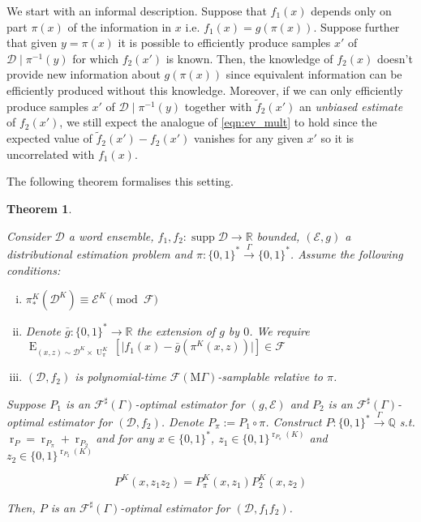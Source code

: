 \documentclass{article}
\numberwithin{equation}{section}
\theoremstyle{definition}
\theoremstyle{plain}
\newtheorem{theorem}{Theorem}[section]
\newcommand{\Bool}{\{0,1\}}
\newcommand{\Words}{{\Bool^*}}
\newcommand{\WordsLen}[1]{{\Bool^{#1}}}
\DeclareMathOperator{\Supp}{supp}
\DeclareMathOperator{\E}{E}
\DeclareMathOperator{\R}{r}
\DeclareMathOperator{\Un}{U}
\newcommand{\Rats}{\mathbb{Q}}
\newcommand{\Reals}{\mathbb{R}}
\newcommand{\Abs}[1]{\lvert #1 \rvert}
\newcommand{\Dist}{\mathcal{D}}
\newcommand{\MGrow}{\mathrm{M}\Gamma}
\newcommand{\Fall}{\mathcal{F}}
\newcommand{\ESG}{\Fall^\sharp(\Gamma)}
\newcommand{\EMG}{\Fall(\MGrow)}
\newcommand{\Scheme}{\xrightarrow{\Gamma}}
\begin{document}
We start with an informal description. Suppose that $f_1(x)$ depends only on part $\pi(x)$ of the information in $x$ i.e. $f_1(x) = g(\pi(x))$. Suppose further that given $y=\pi(x)$ it is possible to efficiently produce samples $x'$ of $\Dist \mid \pi^{-1}(y)$ for which $f_2(x')$ is known. Then, the knowledge of $f_2(x)$ doesn't provide new information about $g(\pi(x))$ since equivalent information can be efficiently produced without this knowledge.
 Moreover, if we can only efficiently produce samples $x'$ of $\Dist \mid \pi^{-1}(y)$ together with $\tilde{f}_2(x')$ an \emph{unbiased estimate} of $f_2(x')$, we still expect the analogue of \ref{eqn:ev_mult} to hold since the expected value of $\tilde{f}_2(x') - f_2(x')$ vanishes for any given $x'$ so it is uncorrelated with $f_1(x)$.
 
The following theorem formalises this setting.

\begin{samepage}
\begin{theorem}
\label{thm:mult}

Consider $\Dist$ a word ensemble, $f_1, f_2: \Supp \Dist \rightarrow \Reals$ bounded, $(\mathcal{E},g)$ a distributional estimation problem and $\pi: \Words \Scheme \Words$. Assume the following conditions:

\begin{enumerate}[(i)]

\item\label{con:thm__mult__dist} $\pi_*^{K}(\Dist^{K}) \equiv \mathcal{E}^{K} \pmod \Fall$

\item\label{con:thm__mult__fun} Denote ${\bar{g}: \Words \rightarrow \Reals}$ the extension of $g$ by $0$.  We require ${\E_{(x,z) \sim \Dist^{K} \times \Un_\pi^{K}}[\Abs{f_1(x)-\bar{g}(\pi^{K}(x,z))}] \in \Fall}$

\item\label{con:thm__mult__smp} $(\Dist, f_2)$ is polynomial-time $\EMG$-samplable relative to $\pi$.

\end{enumerate}

Suppose $P_1$ is an $\ESG$-optimal estimator for $(g,\mathcal{E})$ and $P_2$ is an $\ESG$-optimal estimator for $(\Dist,f_2)$. Denote $P_\pi := P_1 \circ \pi$. Construct ${P: \Words \Scheme \Rats}$ s.t. $\R_P=\R_{P_\pi}+\R_{P_2}$ and for any ${x \in \Words}$, ${z_1 \in \WordsLen{\R_{P_\pi}(K)}}$ and $z_2 \in \WordsLen{\R_{P_2}(K)}$

\begin{equation}
P^{K}(x,z_1 z_2)=P_\pi^{K}(x,z_1) P_2^{K}(x,z_2)
\end{equation}

Then, $P$ is an $\ESG$-optimal estimator for $(\Dist,f_1 f_2)$.

\end{theorem}
\end{samepage}
\end{document}
